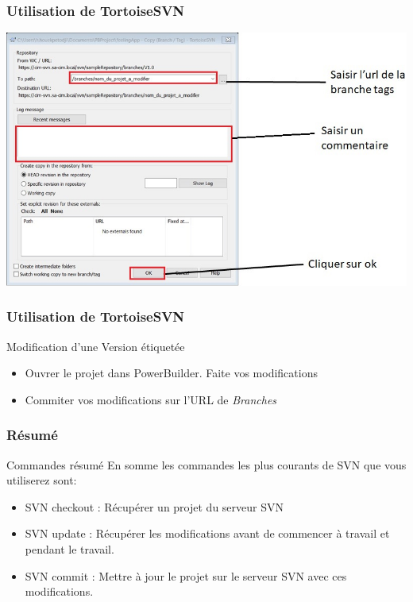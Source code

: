\documentclass{beamer}
\begin{document}
\begin{frame}
\frametitle{Utilisation de TortoiseSVN}
\includegraphics[scale=.7]{../images/etiquetage3.jpg}
\end{frame}

\begin{frame}
\frametitle{Utilisation de TortoiseSVN}
\begin{block}{Modification d'une Version étiquetée}
\begin{itemize}
\item Ouvrer le projet dans PowerBuilder. Faite vos modifications
\item Commiter vos modifications sur l'URL de \alert{\textit{Branches}}
\end{itemize}
\end{block}
\end{frame}

\begin{frame}
\frametitle{Résumé}
\begin{block}{Commandes résumé}
En somme  les commandes les plus courants de SVN que vous  utiliserez sont:
\begin{itemize}
\item  SVN checkout : Récupérer un projet du serveur SVN
\item SVN update : Récupérer les modifications avant de commencer à travail et pendant le travail. 
\item SVN commit : Mettre à jour le projet sur le serveur SVN avec ces modifications.
\end{itemize}
\end{block}

\end{frame}
\end{document}
